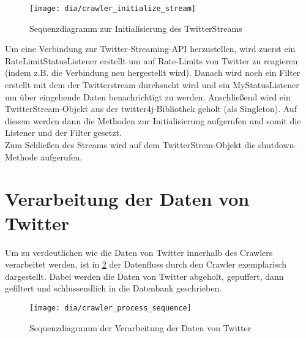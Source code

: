 \begin{figure}[h!]
	\centering
	\texttt{[image: dia/crawler\_initialize\_stream]}
	\caption{Sequenzdiagramm zur Initialisierung des TwitterStreams}
	\label{fig:initialize_stream}
\end{figure}

Um eine Verbindung zur Twitter-Streaming-API herzustellen, wird zuerst ein RateLimitStatusListener erstellt um auf Rate-Limits von Twitter zu reagieren (indem z.B. die Verbindung neu hergestellt wird). Danach wird noch ein Filter erstellt mit dem der Twitterstream durchsucht wird und ein MyStatusListener um über eingehende Daten benachrichtigt zu werden.
Anschließend wird ein TwitterStream-Objekt aus der twitter4j-Bibliothek geholt (als Singleton). Auf diesem werden dann die Methoden zur Initialisierung aufgerufen und somit die Listener und der Filter gesetzt.\\
Zum Schließen des Streams wird auf dem TwitterStrem-Objekt die shutdown-Methode aufgerufen.

\section{Verarbeitung der Daten von Twitter}
Um zu verdeutlichen wie die Daten von Twitter innerhalb des Crawlers verarbeitet werden, ist in \cref{fig:crawler_process} der Datenfluss durch den Crawler exemplarisch dargestellt. Dabei werden die Daten von Twitter abgeholt, gepuffert, dann gefiltert und schlussendlich in die Datenbank geschrieben.

\begin{figure}[h!]
	\centering
	\texttt{[image: dia/crawler\_process\_sequence]}
	\caption{Sequenzdiagramm der Verarbeitung der Daten von Twitter}
	\label{fig:crawler_process}
\end{figure}

